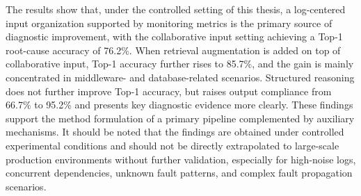 The results show that, under the controlled setting of this thesis, a log-centered input organization supported by monitoring metrics is the primary source of diagnostic improvement, with the collaborative input setting achieving a Top-1 root-cause accuracy of 76.2\%. When retrieval augmentation is added on top of collaborative input, Top-1 accuracy further rises to 85.7\%, and the gain is mainly concentrated in middleware- and database-related scenarios. Structured reasoning does not further improve Top-1 accuracy, but raises output compliance from 66.7\% to 95.2\% and presents key diagnostic evidence more clearly. These findings support the method formulation of a primary pipeline complemented by auxiliary mechanisms. It should be noted that the findings are obtained under controlled experimental conditions and should not be directly extrapolated to large-scale production environments without further validation, especially for high-noise logs, concurrent dependencies, unknown fault patterns, and complex fault propagation scenarios.
